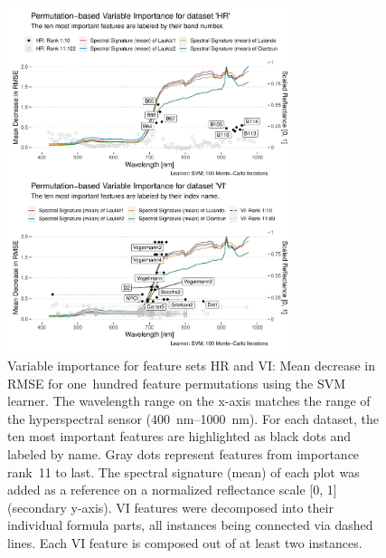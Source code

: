 \documentclass[remotesensing,article,accept,moreauthors,pdftex]{Definitions/mdpi}
\begin{document}
\nointerlineskip
\begin{figure} [H]
\widefigure
		\includegraphics[width=0.75\textwidth] {fi-permut-vi-hr-1.pdf}
		\caption{Variable importance for feature sets HR and VI: Mean decrease in RMSE for one\ hundred feature permutations using the SVM learner. The wavelength range on the x-axis matches the range of the hyperspectral sensor (400~nm--1000~nm). For each dataset, the ten most important features are highlighted as black dots and labeled by name. Gray dots represent features from importance rank~11 to last. The spectral signature (mean) of each plot was added as a reference on a normalized reflectance scale [0, 1] (secondary y-axis). VI features were decomposed into their individual formula parts, all instances being connected via dashed lines. Each VI feature is composed out of at least two instances.}\label{fig:fi-permut-vi-hr}
\end{figure}
\end{document}

